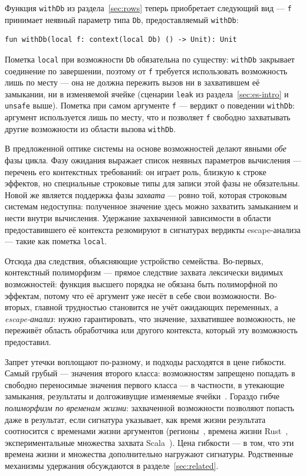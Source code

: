 \documentclass{ProcISPRAS}
\begin{document}
Функция \lstinline|withDb| из раздела~\ref{sec:rows} теперь приобретает следующий вид ---
\lstinline|f| принимает неявный параметр типа \lstinline|Db|, предоставляемый
\lstinline|withDb|:
\begin{lstlisting}[language=colang]
    fun withDb(local f: context(local Db) () -> Unit): Unit
\end{lstlisting}
Пометка \lstinline|local| при возможности \lstinline|Db| обязательна по существу:
\lstinline|withDb| закрывает соединение по завершении, поэтому от \lstinline|f|
требуется использовать возможность лишь по месту --- она не должна пережить вызов ни в
захватившем её замыкании, ни в изменяемой ячейке (сценарии \lstinline|leak| из
раздела~\ref{sec:es-intro} и \lstinline|unsafe| выше).
Пометка при самом аргументе \lstinline|f| --- вердикт о поведении \lstinline|withDb|:
аргумент используется лишь по месту, что и позволяет \lstinline|f| свободно
захватывать другие возможности из области вызова \lstinline|withDb|.

В предложенной оптике системы на основе возможностей делают явными \emph{обе} фазы
цикла. Фазу ожидания выражает список неявных параметров вычисления --- перечень его
контекстных требований: он играет роль, близкую к строке эффектов, но специальные
строковые типы для записи этой фазы не обязательны. Новой же является поддержка фазы
\emph{захвата} --- ровно той, которая строковым
системам недоступна: полученное значение здесь можно захватить замыканием и
нести внутри вычисления. Удержание захваченной зависимости в области предоставившего её контекста
резюмируют в сигнатурах вердикты escape-анализа --- такие как пометка \lstinline|local|.

Отсюда два следствия, объясняющие устройство семейства. Во-первых, контекстный
полиморфизм --- прямое следствие захвата лексически видимых возможностей: функция высшего
порядка не обязана быть полиморфной по эффектам, потому что её аргумент уже несёт в себе
свои возможности. Во-вторых, главной трудностью становится не учёт ожидающих переменных, а
\emph{escape-анализ}: нужно гарантировать, что значение, захватившее возможность, не
переживёт область обработчика или другого контекста, который эту возможность предоставил.

Запрет утечки воплощают по-разному, и подходы расходятся в цене гибкости. Самый грубый ---
значения второго класса: возможностям запрещено попадать в свободно переносимые значения
первого класса --- в частности, в утекающие замыкания, результаты и долгоживущие
изменяемые ячейки~\cite{osvald2016gentrification}. Гораздо гибче \emph{полиморфизм по
временам жизни}: захваченной возможности позволяют попасть даже в результат, если
сигнатура указывает, как время жизни результата соотносится с временами жизни аргументов
(регионы~\cite{tofte1997region}, времена жизни Rust~\cite{matsakis2014rust},
экспериментальные множества захвата Scala~\cite{boruch2023capturing}). Цена гибкости ---
в том, что эти времена жизни и множества дополнительно нагружают сигнатуры.
Родственные механизмы удержания обсуждаются в разделе~\ref{sec:related}.
\end{document}
